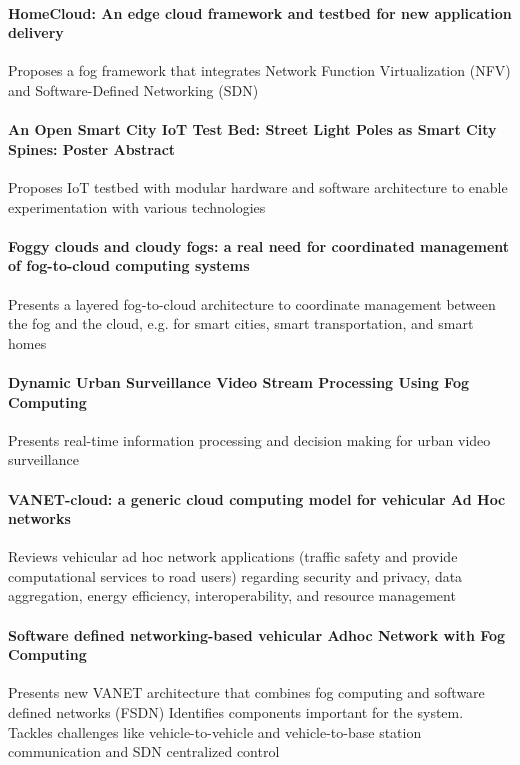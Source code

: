 \paragraph{HomeCloud: An edge cloud framework and testbed for new application delivery} \cite{pan_homecloud:_2016}
Proposes a fog framework that integrates Network Function Virtualization (NFV) and Software-Defined Networking (SDN)

\paragraph{An Open Smart City IoT Test Bed: Street Light Poles as Smart City Spines: Poster Abstract}\cite{amrutur_open_2017}
Proposes IoT testbed with modular hardware and software architecture to enable experimentation with various technologies

\paragraph{Foggy clouds and cloudy fogs: a real need for coordinated management of fog-to-cloud computing systems}\cite{masip-bruin_foggy_2016}
Presents a layered fog-to-cloud architecture to coordinate management between the fog and the cloud, e.g. for smart cities, smart transportation, and smart homes

\paragraph{Dynamic Urban Surveillance Video Stream Processing Using Fog Computing} \cite{chen_dynamic_2016}
Presents real-time information processing and decision making for urban video surveillance

\paragraph{VANET-cloud: a generic cloud computing model for vehicular Ad Hoc networks} \cite{bitam_vanet-cloud:_2015}
Reviews vehicular ad hoc network applications (traffic safety and provide computational services to road users) regarding
security and privacy, data aggregation, energy efficiency, interoperability, and resource management

\paragraph{Software defined networking-based vehicular Adhoc Network with Fog Computing} \cite{truong_software_2015}
Presents new VANET architecture that combines fog computing and software defined networks (FSDN)
Identifies components important for the system. Tackles challenges like vehicle-to-vehicle and vehicle-to-base station communication and SDN centralized control

